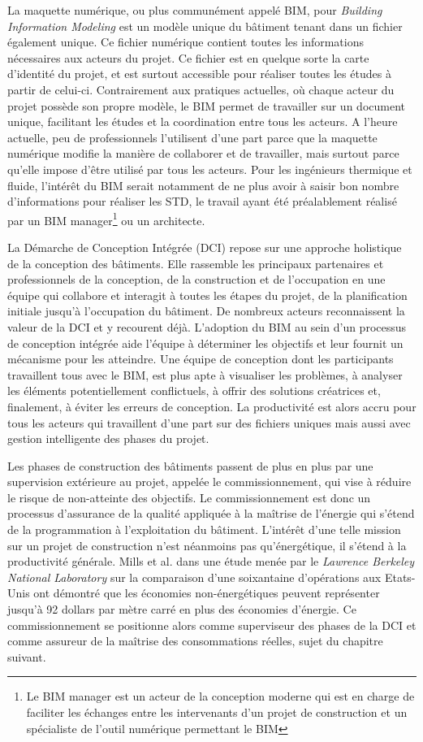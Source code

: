 La maquette numérique, ou plus communément appelé BIM, pour \textit{Building Information Modeling} est un modèle unique du bâtiment tenant dans un fichier également unique. Ce fichier numérique contient toutes les informations nécessaires aux acteurs du projet. Ce fichier est en quelque sorte la carte d'identité du projet, et est surtout accessible pour réaliser toutes les études à partir de celui-ci. Contrairement aux pratiques actuelles, où chaque acteur du projet possède son propre modèle, le BIM permet de travailler sur un document unique, facilitant les études et la coordination entre tous les acteurs. A l'heure actuelle, peu de professionnels l'utilisent d'une part parce que la maquette numérique modifie la manière de collaborer et de travailler, mais surtout parce qu'elle impose d'être utilisé par tous les acteurs. Pour les ingénieurs thermique et fluide, l'intérêt du BIM serait notamment de ne plus avoir à saisir bon nombre d'informations pour réaliser les STD, le travail ayant été préalablement réalisé par un BIM manager\footnote{Le BIM manager est un acteur de la conception moderne qui est en charge de faciliter les échanges entre les intervenants d'un projet de construction et un spécialiste de l'outil numérique permettant le BIM} ou un architecte. 

La Démarche de Conception Intégrée (DCI) repose sur une approche holistique de la conception des bâtiments. Elle rassemble les principaux partenaires et professionnels de la conception, de la construction et de l'occupation en une équipe qui collabore et interagit à toutes les étapes du projet, de la planification initiale jusqu'à l'occupation du bâtiment. De nombreux acteurs reconnaissent la valeur de la DCI et y recourent déjà. L'adoption du BIM au sein d'un processus de conception intégrée aide l'équipe à déterminer les objectifs et leur fournit un mécanisme pour les atteindre. Une équipe de conception dont les participants travaillent tous avec le BIM, est plus apte à visualiser les problèmes, à analyser les éléments potentiellement conflictuels, à offrir des solutions créatrices et, finalement, à éviter les erreurs de conception. La productivité est alors accru pour tous les acteurs qui travaillent d'une part sur des fichiers uniques mais aussi avec gestion intelligente des phases du projet.

Les phases de construction des bâtiments passent de plus en plus par une supervision extérieure au projet, appelée le commissionnement, qui vise à réduire le risque de non-atteinte des objectifs. Le commissionnement est donc un processus d'assurance de la qualité appliquée à la maîtrise de l'énergie qui s'étend de la programmation à l'exploitation du bâtiment. L'intérêt d'une telle mission sur un projet de construction n'est néanmoins pas qu'énergétique, il s'étend à la productivité générale. Mills et al. \cite{Mills-04} dans une étude menée par le \textit{Lawrence Berkeley National Laboratory} sur la comparaison d'une soixantaine d'opérations aux Etats-Unis ont démontré que les économies non-énergétiques peuvent représenter jusqu'à 92 dollars par mètre carré en plus des économies d'énergie. Ce commissionnement se positionne alors comme superviseur des phases de la DCI et comme assureur de la maîtrise des consommations réelles, sujet du chapitre suivant.

